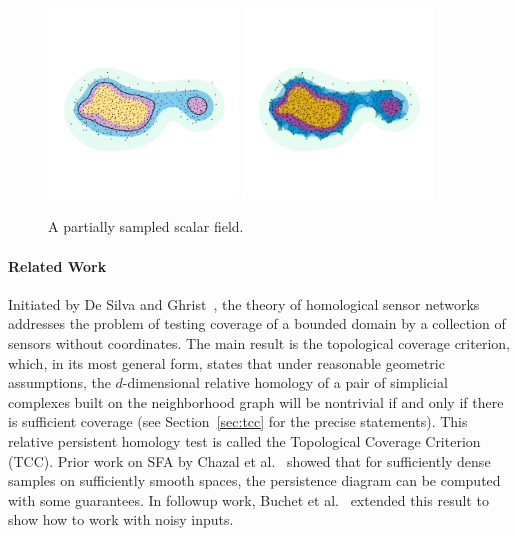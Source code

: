 \begin{figure}[htbp]
  \centering
  \includegraphics[trim=0 500 0 500, clip, width=0.45\textwidth]{figures/samples/samples_comp.pdf}
  \includegraphics[trim=0 500 0 500, clip, width=0.45\textwidth]{figures/samples/scalar1_comp.pdf}
  \caption{A partially sampled scalar field.}\label{fig:main}
\end{figure}

\paragraph{Related Work}

Initiated by De Silva and Ghrist~\cite{desilva06coordinate,desilva07coverage,desilva07homological}, the theory of homological sensor networks addresses the problem of testing coverage of a bounded domain by a collection of sensors without coordinates.
The main result is the topological coverage criterion, which, in its most general form, states that under reasonable geometric assumptions, the $d$-dimensional relative homology of a pair of simplicial complexes built on the neighborhood graph will be nontrivial if and only if there is sufficient coverage (see Section~\ref{sec:tcc} for the precise statements).
This relative persistent homology test is called the Topological Coverage Criterion (TCC).
Prior work on SFA by Chazal et al.~\cite{chazal09analysis} showed that for sufficiently dense samples on sufficiently smooth spaces, the persistence diagram can be computed with some guarantees.
In followup work, Buchet et al.~\cite{buchet15topological} extended this result to show how to work with noisy inputs.

